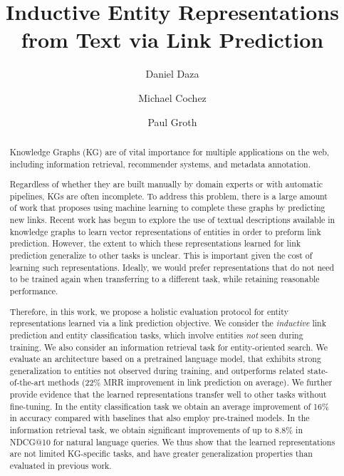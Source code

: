 \documentclass[sigconf]{acmart}
\begin{document}
\title{Inductive Entity Representations from Text via Link Prediction}

\author{Daniel Daza}

\author{Michael Cochez}

\author{Paul Groth}



\begin{abstract}
Knowledge Graphs (KG) are of vital importance for multiple applications on the web, including information retrieval, recommender systems, and metadata annotation. 

Regardless of whether they are built manually by domain experts or with automatic pipelines, KGs are often incomplete. To address this problem, there is a large amount of work that proposes using machine learning to complete these graphs by predicting new links. Recent work has begun to explore the use of textual descriptions available in knowledge graphs to learn vector representations of entities in order to preform link prediction. However, the extent to which these representations learned for link prediction generalize to other tasks is unclear. This is important given the cost of learning such representations. Ideally, we would prefer representations that do not need to be trained again when transferring to a different task, while retaining reasonable performance.

Therefore, in this work, we propose a holistic evaluation protocol for entity representations learned via a link prediction objective. We consider the \emph{inductive} link prediction and entity classification tasks, which involve entities \emph{not} seen during training. We also consider an information retrieval task for entity-oriented search. We evaluate an architecture based on a pretrained language model, that exhibits strong generalization to entities not observed during training, and outperforms related state-of-the-art methods (22\% MRR improvement in link prediction on average). We further provide evidence that the learned representations transfer well to other tasks without fine-tuning. In the entity classification task we obtain an average improvement of 16\% in accuracy compared with baselines that also employ pre-trained models. In the information retrieval task, we obtain significant improvements of up to 8.8\% in NDCG@10 for natural language queries. We thus show that the learned representations are not limited KG-specific tasks, and have greater generalization properties than evaluated in previous work.
\end{abstract}
\end{document}
